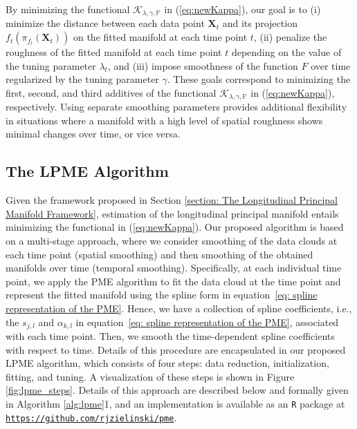 \documentclass[12pt]{article}
\newcommand{\blind}{1}
\theoremstyle{definition}
\begin{document}
By minimizing the functional $\mathcal{K}_{\lambda, \gamma, \mathbb{P}}$ in (\ref{eq:newKappa}), our goal is to (i) minimize the distance between each data point $\mathbf{X}_t$ and its projection $f_t\left(\pi_{f_t}(\mathbf{X}_t)\right)$ on the fitted manifold at each time point $t$, (ii) penalize the roughness of the fitted manifold at each time point $t$ depending on the value of the tuning parameter $\lambda_t$, and (iii) impose smoothness of the function $F$ over time regularized by the tuning parameter $\gamma$. These goals correspond to minimizing the first, second, and third additives of the functional $\mathcal{K}_{\lambda, \gamma, \mathbb{P}}$ in (\ref{eq:newKappa}), respectively. Using separate smoothing parameters provides additional flexibility in situations where a manifold with a high level of spatial roughness shows minimal changes over time, or vice versa.







\subsection{The LPME Algorithm}

Given the framework proposed in Section \ref{section: The Longitudinal Principal Manifold Framework}, estimation of the longitudinal principal manifold entails minimizing the functional in (\ref{eq:newKappa}). Our proposed algorithm is based on a multi-stage approach, where we consider smoothing of the data clouds at each time point (spatial smoothing) and then smoothing of the obtained manifolds over time (temporal smoothing). Specifically, at each individual time point, we apply the PME algorithm \citep[alg. 2]{meng2021Principal} to fit the data cloud at the time point and represent the fitted manifold using the spline form in equation~\eqref{eq: spline representation of the PME}. Hence, we have a collection of spline coefficients, i.e., the $s_{j,l}$ and $\alpha_{k,l}$ in equation~\eqref{eq: spline representation of the PME}, associated with each time point. Then, we smooth the time-dependent spline coefficients with respect to time. Details of this procedure are encapsulated in our proposed LPME algorithm, which consists of four steps: data reduction, initialization, fitting, and tuning. A visualization of these steps is shown in Figure \ref{fig:lpme_steps}. Details of this approach are described below and formally given in Algorithm \ref{alg:lpme}\blind{, and an implementation is available as an \texttt{R} package at \href{https://github.com/rjzielinski/pme}{\texttt{https://github.com/rjzielinski/pme}}}\fi.
\end{document}

